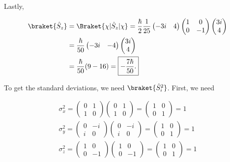 \begin{parts}
Lastly,


\begin{align}
    \braket{\hat{S}_z} &= \Braket{\chi | \hat{S}_z | \chi} = \frac{\hbar}{2}\frac{1}{25}\begin{pmatrix}-3i & 4\end{pmatrix}\begin{pmatrix}1 & 0 \\ 0 & -1\end{pmatrix}\begin{pmatrix}3i \\ 4\end{pmatrix} \\
    &= \frac{\hbar}{50}\begin{pmatrix}-3i & -4\end{pmatrix}\begin{pmatrix}3i \\ 4\end{pmatrix} \\
    &= \frac{\hbar}{50}(9-16) = \boxed{-\frac{7\hbar}{50}.}
\end{align}



\item To get the standard deviations, we need $\braket{\hat{S}_i^2}$. First, we need

\begin{gather}
    \sigma_x^2 = \begin{pmatrix}0 & 1 \\ 1 & 0\end{pmatrix}\begin{pmatrix}0 & 1 \\ 1 & 0\end{pmatrix} = \begin{pmatrix}1 & 0 \\ 0 & 1\end{pmatrix} = 1 \\
    \sigma_y^2 = \begin{pmatrix}0 & -i \\ i & 0\end{pmatrix}\begin{pmatrix}0 & -i \\ i & 0\end{pmatrix} = \begin{pmatrix}1 & 0 \\ 0 & 1\end{pmatrix} = 1 \\
    \sigma_z^2 = \begin{pmatrix}1 & 0 \\ 0 & -1\end{pmatrix}\begin{pmatrix}1 & 0 \\ 0 & -1\end{pmatrix} = \begin{pmatrix}1 & 0 \\ 0 & 1\end{pmatrix} = 1 \\
\end{gather}


\end{parts}
